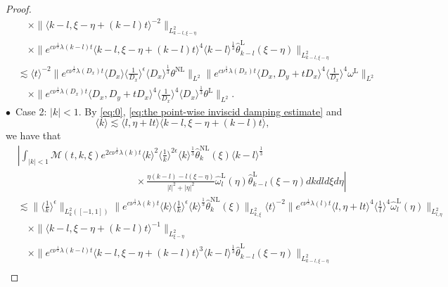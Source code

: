 \documentclass[reqno, 12pt]{amsart} %
\theoremstyle{plain} %
\theoremstyle{definition}
\theoremstyle{remark}
\numberwithin{equation}{section} %
\newcommand{\no}{\nonumber}
\newcommand{\lt}{\left}
\newcommand{\rt}{\right}
\begin{document}
\begin{proof}
\begin{equation}
\begin{aligned}
				& \quad \times\|\langle k-l, \xi-\eta+(k-l) t\rangle^{-2}\|_{L_{k-l, \xi-\eta}^2} \\
				& \quad \times\|e^{c \nu^{\frac{1}{3}} \lambda(k-l) t}\langle k-l, \xi-\eta+(k-l) t\rangle^4 \langle k-l \rangle^\frac13  \hat{\theta}_{k-l}^{\mathrm{L}}(\xi-\eta)\|_{L_{k-l, \xi-\eta}^2} \\
				& \lesssim\langle t\rangle^{-2} \|e^{c \nu^{\frac{1}{3}} \lambda\left(D_x\right) t}\langle D_x\rangle  \langle \frac{1}{D_x}\rangle^\epsilon \langle D_x \rangle^\frac13  \theta^{\mathrm{NL}}\|_{L^2}    \|e^{c \nu^{\frac{1}{3}} \lambda\left(D_x\right) t}\langle D_x, D_y + tD_x\rangle^4\langle\frac{1}{D_x}\rangle^4 \omega^{\mathrm{L}} \|_{L^2} \\
				&\quad \times \|e^{c \nu^{\frac{1}{3}} \lambda\left(D_x\right) t}\langle D_x, D_y + tD_x\rangle^4\langle\frac{1}{D_x}\rangle^4 \langle D_x \rangle^\frac13   \theta^{\mathrm{L}} \|_{L^2}.
			\end{aligned}
		\end{equation}
		$\bullet$~Case 2:  $|k| < 1$. By \eqref{eq:0}, \eqref{eq:the point-wise inviscid damping estimate} and 
		\begin{equation*} 
			\langle k \rangle \lesssim \langle l, \eta+l t\rangle\langle k-l, \xi-\eta+(k-l) t\rangle,
		\end{equation*}
		we have that
		\begin{align}  \label{eq:temp10}
			&\no \left|\int_{|k| < 1}  \mathcal{M}(t, k, \xi) e^{2 c \nu^{\frac{1}{3}} \lambda(k) t}\langle k\rangle^2\langle\frac{1}{k}\rangle^{2 \epsilon} \langle k \rangle^\frac13  \hat{\theta }_k^{\mathrm{NL}}(\xi) \langle k-l \rangle^\frac13 \rt. \\
			&\no \lt. \qquad\qquad\qquad\qquad\qquad\qquad  \times \frac{\eta(k-l)-l(\xi-\eta)}{|l|^2+|\eta|^2} \hat{\omega}_l^{\mathrm{L}}(\eta) \hat{\theta }_{k-l}^{\mathrm{L}}(\xi-\eta) d k d l d \xi d \eta\right| \\
			& \no\lesssim \| \langle\frac{1}{k}\rangle^{ \epsilon} \|_{L_k^2 ([-1, 1])}\|e^{c \nu^{\frac{1}{3}} \lambda(k) t}\langle k\rangle \langle \frac1k \rangle^\epsilon \langle k \rangle^\frac13  \hat{\theta}_k^{\mathrm{NL}}(\xi)\|_{L_{k, \xi}^2}\langle t\rangle^{-2}\|e^{c \nu^{\frac{1}{3}} \lambda(l) t}\langle l, \eta+l t\rangle^4\langle\frac{1}{l}\rangle^4 \hat{\omega}_l^{\mathrm{L}}(\eta)\|_{L_{l, \eta}^2} \\
			&\no \quad \times\|\langle k-l, \xi-\eta+(k-l) t\rangle^{-1}\|_{L_{ \xi-\eta}^2} \\
			&\no \quad \times\|e^{c \nu^{\frac{1}{3}} \lambda(k-l) t}\langle k-l, \xi-\eta+(k-l) t\rangle^3 \langle k-l \rangle^\frac13  \hat{\theta}_{k-l}^{\mathrm{L}}(\xi-\eta)\|_{L_{k-l, \xi-\eta}^2} \\

\end{align}
\end{proof}
\end{document}
